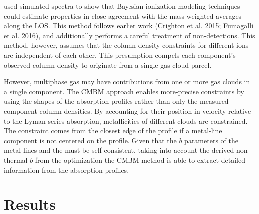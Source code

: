 \documentclass[fleqn,usenatbib]{mnras}
\begin{document}
\cite{Liang2018} used simulated spectra to show that Bayesian ionization modeling techniques could estimate properties in close agreement with the  mass-weighted averages along the LOS.
This method follows earlier work (Crighton et al. 2015; Fumagalli et al. 2016), and additionally performs a careful treatment of non-detections.
This method, however, assumes that the column density constraints for different ions are independent of each other.
This presumption compels each component's observed column density to originate from a single gas cloud parcel.

However, multiphase gas may have contributions from one or more gas clouds in a single component.
The CMBM approach enables more-precise constraints by using the shapes of the absorption profiles rather than only the measured component column densities.
By accounting for their position in velocity relative to the Lyman series absorption, metallicities of different clouds are constrained.
The constraint comes from the closest edge of the  profile if a metal-line component is not centered on the  profile.
Given that the $b$ parameters of the metal lines and the  must be self consistent, taking into account the derived non-thermal $b$ from the optimization the CMBM method is able to extract detailed information from the absorption profiles.

\section{Results}
\label{s: results}
\end{document}

